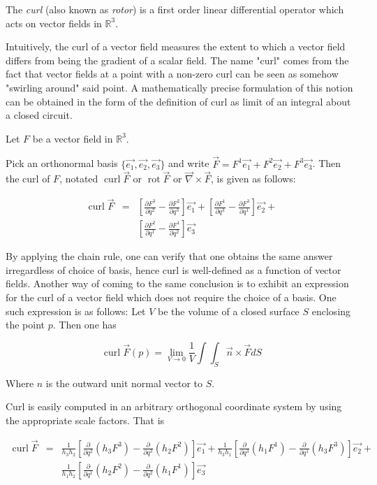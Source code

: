 \documentclass[12pt]{article}
\begin{document}
The \emph{curl} (also known as \emph{rotor}) is a first order linear
differential operator which acts on vector fields in $\mathbb{R}^{3}$.

Intuitively, the curl of a vector field measures the extent to which a
vector field differs from being the gradient of a scalar field.  The
name "curl" comes from the fact that vector fields at a point with a
non-zero curl can be seen as somehow "swirling around" said point.  A
mathematically precise formulation of this notion can be obtained in
the form of the definition of curl as limit of an integral about a
closed circuit.

Let $F$ be a  vector field in $\mathbb{R}^{3}$.

Pick an orthonormal basis $\{\vec{e_{1}},\vec{e_{2}},\vec{e_{3}}\}$
and write
$\vec{F}=F^{1}\vec{e_{1}}+F^{2}\vec{e_{2}}+F^{3}\vec{e_{3}}$.  Then
the curl of $F$, notated $\operatorname{curl}\vec{F}$ or
$\operatorname{rot}\vec{F}$ or $\vec{\nabla}\times\vec{F}$, is given
as follows:
 
\begin{eqnarray*}
\operatorname{curl}\vec{F} & = & \left[\frac{\partial F^{3}}{\partial
q^{2}}-\frac{\partial F^{2}}{\partial
q^{3}}\right]\vec{e_{1}}+\left[\frac{\partial F^{1}}{\partial
q^{3}}-\frac{\partial F^{3}}{\partial
q^{1}}\right]\vec{e_{2}} + \\ 
 & \; & \left[\frac{\partial F^{2}}{\partial 
q^{1}}-\frac{\partial F^{1}}{\partial 
q^{2}}\right]\vec{e_{3}}
\end{eqnarray*}

By applying the chain rule, one can verify that one obtains the same
answer irregardless of choice of basis, hence curl is well-defined as
a function of vector fields.  Another way of coming to the same
conclusion is to exhibit an expression for the curl of a vector field
which does not require the choice of a basis.  One such expression is
as follows: Let $V$ be the volume of a closed surface $S$ enclosing
the point $p$.  Then one has

\[
\operatorname{curl}\vec{F}(p)=\lim_{V\to
0}\frac{1}{V}\int\!\!\int_{S}\vec{n}\times\vec{F}dS
\]

Where $n$ is the outward unit normal vector to $S$.

Curl is easily computed in an
arbitrary orthogonal coordinate system by using the appropriate
scale factors. That is


\begin{eqnarray*}
\operatorname{curl}\vec{F} & = & \frac{1}{h_{3}h_{2}}\left[\frac{\partial}{\partial
q^{2}}\left(h_{3}F^{3}\right)-\frac{\partial}{\partial
q^{3}}\left(h_{2}F^{2}\right)\right]\vec{e_{1}}+\frac{1}{h_{3}h_{1}}\left[\frac{\partial}{\partial
q^{3}}\left(h_{1}F^{1}\right)-\frac{\partial}{\partial
q^{1}}\left(h_{3}F^{3}\right)\right]\vec{e_{2}} + \\ 
 & \; & \frac{1}{h_{1}h_{2}}\left[\frac{\partial}{\partial
q^{1}}\left(h_{2}F^{2}\right)-\frac{\partial}{\partial
q^{2}}\left(h_{1}F^{1}\right)\right]\vec{e_{3}}
\end{eqnarray*}
\end{document}
